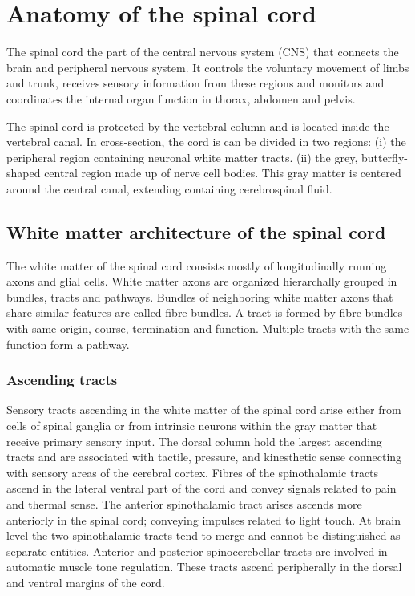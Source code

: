 \section{Anatomy of the spinal cord}
The spinal cord the part of the central nervous system (CNS) that connects the brain and peripheral nervous system. It controls the voluntary movement of limbs and trunk, receives sensory information from these regions and monitors and coordinates the internal organ function in thorax, abdomen and pelvis. 

The spinal cord is protected by the vertebral column and is located inside the vertebral canal. In cross-section, the cord is can be divided in two regions: (i) the peripheral region containing neuronal white matter tracts. (ii) the grey, butterfly-shaped central region made up of nerve cell bodies. This gray matter is centered around the central canal, extending containing cerebrospinal fluid.

\subsection*{White matter architecture of the spinal cord}
The white matter of the spinal cord consists mostly of longitudinally running axons and glial cells. White matter axons are organized hierarchally grouped in bundles, tracts and pathways. Bundles of neighboring white matter axons that share similar features are called fibre bundles. A tract is formed by fibre bundles with same origin, course, termination and function. Multiple tracts with the same function form a pathway.

\subsubsection*{Ascending tracts}
\label{sec:section_name}
Sensory tracts ascending in the white matter of the spinal cord arise either from cells of spinal ganglia or from intrinsic neurons within the gray matter that receive primary sensory input. The dorsal column hold the largest ascending tracts and are associated with tactile, pressure, and kinesthetic sense connecting with sensory areas of the cerebral cortex. Fibres of the spinothalamic tracts ascend in the lateral ventral part of the cord and convey signals related to pain and thermal sense. The anterior spinothalamic tract arises ascends more anteriorly in the spinal cord; conveying impulses related to light touch. At brain level the two spinothalamic tracts tend to merge and cannot be distinguished as separate entities. Anterior and posterior spinocerebellar tracts are involved in automatic muscle tone regulation. These tracts ascend peripherally in the dorsal and ventral margins of the cord.

